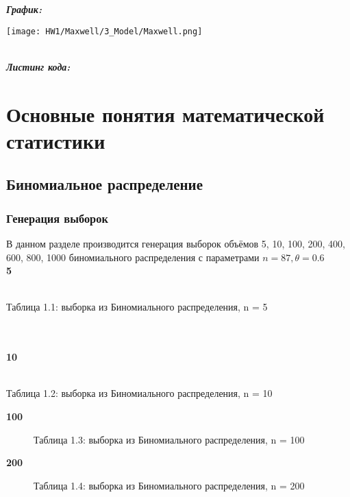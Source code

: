 \documentclass[14pt,a4paper,oneside]{extbook}
\begin{document}
    \textbf{\textit{График:}}
    \begin{center}
        \texttt{[image: HW1/Maxwell/3\_Model/Maxwell.png]}
    \end{center}
    \\
    \textbf{\textit{Листинг кода:}}
    
	
	
	\chapter{Основные понятия математической статистики}
	
	\section{Биномиальное распределение}
	\subsection{Генерация выборок}
	В данном разделе производится генерация выборок объёмов 5, 10, 100, 200, 400, 600, 800, 1000 биномиального распределения с параметрами $\displaystyle n = 87, \theta = 0.6$ \\
	
	\textbf{5} \\
	\begin{center}
	    \\
	   \caption{Таблица 1.1: выборка из Биномиального распределения, n = 5}
	\end{center}
	\\
	\\
	
	\textbf{10} \\
	\begin{center}
	    \\
	   \caption{Таблица 1.2: выборка из Биномиального распределения, n = 10}
	\end{center}
	\newpage
	
	\textbf{100} \\
	\begin{figure}[h]
        \centering
        \caption{Таблица 1.3: выборка из Биномиального распределения, n = 100}
        \label{fig:my_label}
    \end{figure}

	\textbf{200} \\
	\begin{figure}[h]
        \centering
        \caption{Таблица 1.4: выборка из Биномиального распределения, n = 200}
        \label{fig:my_label}
    \end{figure}
\end{document}
